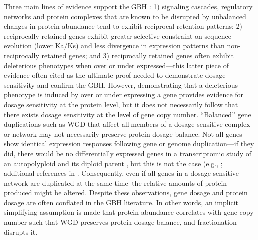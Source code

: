 \documentclass[11pt]{article}
\begin{document}
Three main lines of evidence support the GBH \citep{tasdighian2017, freeling2009, hou2018, edger2009}: 1) signaling cascades, regulatory networks and protein complexes that are known to be disrupted by unbalanced changes in protein abundance tend to exhibit reciprocal retention patterns; 2) reciprocally retained genes exhibit greater selective constraint on sequence evolution (lower Ka/Ks) and less divergence in expression patterns than non-reciprocally retained genes; and 3) reciprocally retained genes often exhibit deleterious phenotypes when over or under expressed---this latter piece of evidence often cited as the ultimate proof needed to demonstrate dosage sensitivity and confirm the GBH.
However, demonstrating that a deleterious phenotype is induced by over or under expressing a gene provides evidence for dosage sensitivity at the protein level, but it does not necessarily follow that there exists dosage sensitivity at the level of gene copy number.
``Balanced'' gene duplications such as WGD that affect all members of a dosage sensitive complex or network may not necessarily preserve protein dosage balance.
Not all genes show identical expression responses following gene or genome duplication---if they did, there would be no differentially expressed genes in a transcriptomic study of an autopolyploid and its diploid parent \citep{pirrello2018}, but this is not the case (e.g., \cite{hou2018, guo1996, riddle2006, robinson2018, stupar2007, yu2010}; additional references in \citep{doyle2019}.
Consequently, even if all genes in a dosage sensitive network are duplicated at the same time, the relative amounts of protein produced might be altered.
Despite these observations, gene dosage and protein dosage are often conflated in the GBH literature.
In other words, an implicit simplifying assumption is made that protein abundance correlates with gene copy number \citep{papp2003} such that WGD preserves protein dosage balance, and fractionation disrupts it.\\
\end{document}
